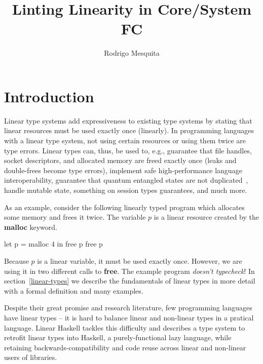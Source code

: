 \documentclass[a4paper, draft]{report}
\title{Linting Linearity in Core/System FC}
\author{Rodrigo Mesquita}
\begin{document}
\maketitle
\tableofcontents

\chapter{Introduction}

Linear type systems\cite{} add expressiveness to existing type systems by
stating that linear resources must be used exactly once (linearly). In
programming languages with a linear type system, not using certain resources or
using them twice are type errors. Linear types can, thus, be used to, e.g.,
guarantee that file handles, socket descriptors, and allocated memory are freed
exactly once (leaks and double-frees become type errors)\cite{}, implement safe
high-performance language interoperability\cite{}, guarantee that quantum
entangled states are not duplicated~\cite{}, handle mutable state\cite{},
something on session types guarantees\cite{}, and much more.


As an example, consider the following linearly typed program which allocates
some memory and frees it twice. The variable $p$ is a linear resource created by
the \textbf{malloc} keyword.

\begin{code}
let p = malloc 4
 in free p
    free p
\end{code}

Because $p$ is a linear variable, it must be used exactly once. However, we are
using it in two different calls to \textbf{free}. The example program
\emph{doesn't typecheck}! In section~\ref{linear-types} we describe the
fundamentals of linear types in more detail with a formal definition and many
examples.

Despite their great promise and research literature, few programming languages
have linear types --
it is hard to balance linear and non-linear types in a pratical language. Linear
Haskell\cite{linearhaskell} tackles this difficulty and describes a type system
to retrofit linear types into Haskell, a purely-functional lazy language, while
retaining backwards-compatibility and code reuse across linear and non-linear
users of libraries.
\end{document}
